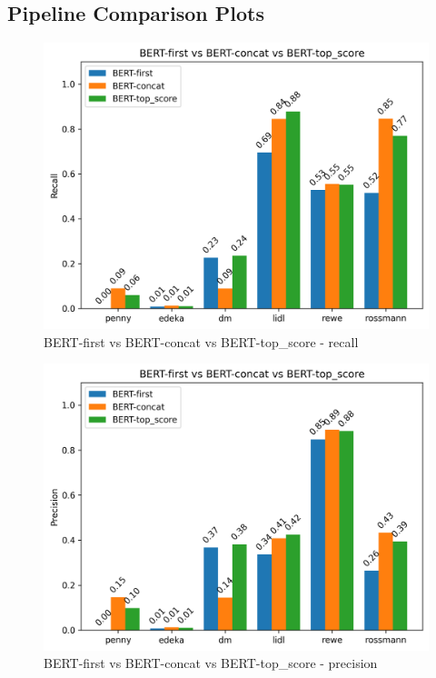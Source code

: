 \documentclass[licencjacka,en]{pracamgr}
\begin{document}
\begin{appendices}
\chapter{Pipeline Comparison Plots} \label{app:pipeline_comp}
\begin{figure}[ht]
    \centering
    \includegraphics[width=0.8\linewidth]{bachelor_images/benchmark/berts_recall.png}
    \caption{BERT-first vs BERT-concat vs BERT-top\_score - recall}
    \label{fig:berts_recall}
\end{figure}

\begin{figure}[ht]
    \centering
    \includegraphics[width=0.8\linewidth]{bachelor_images/benchmark/berts_precision.png}
    \caption{BERT-first vs BERT-concat vs BERT-top\_score - precision}
    \label{fig:berts_precision}
\end{figure}


\end{appendices}
\end{document}
